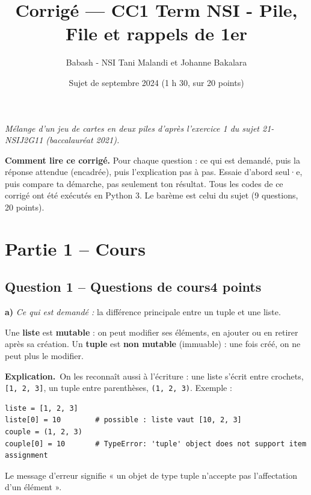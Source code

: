\documentclass[11pt, a4paper]{exam}
\title{Corrigé — CC1 Term NSI - Pile, File et rappels de 1er}
\author{Babash - NSI Tani Malandi et Johanne Bakalara}
\date{Sujet de septembre 2024 (1 h 30, sur 20 points)}
\newcommand{\code}[1]{\texttt{#1}}
\newcommand{\Qt}[2]{\subsection*{#1\hfill{\normalfont\small #2}}}
\newcommand{\rappel}[1]{\noindent\textit{Ce qui est demandé :} #1\par\smallskip}
\newcommand{\explication}{\noindent\textbf{Explication.}\ }
\begin{document}
\pagestyle{headandfoot}
\firstpageheader{}{}{}
\runningheadrule
{}

\maketitle
\thispagestyle{headandfoot}
\begin{center}\footnotesize\itshape Mélange d'un jeu de cartes en deux piles d'après l'exercice 1 du sujet 21-NSIJ2G11 (baccalauréat 2021).\end{center}

\begin{tcolorbox}[colback=white, colframe=black, boxrule=0.5pt, arc=1mm, left=2mm, right=2mm]
\small\textbf{Comment lire ce corrigé.} Pour chaque question : ce qui est demandé, puis la réponse attendue (encadrée), puis l'explication pas à pas. Essaie d'abord seul·e, puis compare ta démarche, pas seulement ton résultat. Tous les codes de ce corrigé ont été exécutés en Python 3.
Le barème est celui du sujet (9 questions, 20 points).
\end{tcolorbox}

\section*{Partie 1 -- Cours}

\Qt{Question 1 -- Questions de cours}{4 points}

\textbf{a)} \rappel{la différence principale entre un tuple et une liste.}
\begin{reponse}
Une \textbf{liste} est \textbf{mutable} : on peut modifier ses éléments, en ajouter ou en retirer après sa création. Un \textbf{tuple} est \textbf{non mutable} (immuable) : une fois créé, on ne peut plus le modifier.
\end{reponse}
\explication On les reconnaît aussi à l'écriture : une liste s'écrit entre crochets, \code{[1, 2, 3]}, un tuple entre parenthèses, \code{(1, 2, 3)}. Exemple :
\begin{lstlisting}
liste = [1, 2, 3]
liste[0] = 10        # possible : liste vaut [10, 2, 3]
couple = (1, 2, 3)
couple[0] = 10       # TypeError: 'tuple' object does not support item assignment
\end{lstlisting}
Le message d'erreur signifie « un objet de type tuple n'accepte pas l'affectation d'un élément ».
\end{document}
